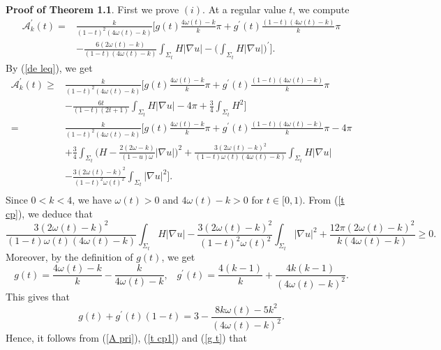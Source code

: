 \documentclass[12pt]{article}
\theoremstyle{definition}
\theoremstyle{plain}
\numberwithin{equation}{section}
\begin{document}
\textbf{Proof of Theorem 1.1}.
First we prove $ (i) $. At a regular value $ t $, we compute
\begin{equation}\label{A pri}
\begin{aligned}
\mathcal{A}_{k}^{\prime}(t)=&\frac{k}{(1-t)^{2}(4\omega(t)-k)}\Big[g(t)\frac{4\omega(t)-k}{k}\pi+g^{\prime}(t)\frac{(1-t)(4\omega(t)-k)}{k}\pi\\
&-\frac{6(2\omega(t)-k)}{(1-t)(4\omega(t)-k)}\int_{\Sigma_{t}}H|\nabla u|-\Big(\int_{\Sigma_{t}}H|\nabla u|\Big)^{\prime} \Big].
\end{aligned}
\end{equation}
By (\ref{de leq}), we get
\begin{equation}
\begin{aligned}
\mathcal{A}_{k}^{\prime}(t)\geq& \frac{k}{(1-t)^{2}(4\omega(t)-k)}\Big[g(t)\frac{4\omega(t)-k}{k}\pi+g^{\prime}(t)\frac{(1-t)(4\omega(t)-k)}{k}\pi\\
&-\frac{6t}{(1-t)(2t+1)}\int_{\Sigma_{t}}H|\nabla u|-4\pi+\frac{3}{4}\int_{\Sigma_{t}}H^{2} \Big]\\
=&\frac{k}{(1-t)^{2}(4\omega(t)-k)}\Big[g(t)\frac{4\omega(t)-k}{k}\pi+g^{\prime}(t)\frac{(1-t)(4\omega(t)-k)}{k}\pi-4\pi\\
&+\frac{3}{4}\int_{\Sigma_{t}}\Big(H-\frac{2(2\omega-k)}{(1-u)\omega}|\nabla u|\Big)^{2}+\frac{3(2\omega(t)-k)^{2}}{(1-t)\omega(t)(4\omega(t)-k)}\int_{\Sigma_{t}}H|\nabla u|\\
&-\frac{3(2\omega(t)-k)^{2}}{(1-t)^{2}\omega(t)^{2}}\int_{\Sigma_{t}}|\nabla u|^{2}\Big].\\
\end{aligned}
\end{equation}
Since $ 0<k<4 $, we have $ \omega(t)>0 $ and $ 4\omega(t)-k>0 $ for $ t\in [0,1) $. From (\ref{t cp}), we deduce that 
\begin{equation}\label{t cp1}
\frac{3(2\omega(t)-k)^{2}}{(1-t)\omega(t)(4\omega(t)-k)}\int_{\Sigma_{t}}H|\nabla u|
-\frac{3(2\omega(t)-k)^{2}}{(1-t)^{2}\omega(t)^{2}}\int_{\Sigma_{t}}|\nabla u|^{2}+\frac{12\pi(2\omega(t)-k)^{2}}{k(4\omega(t)-k)}\geq 0.
\end{equation}
Moreover, by the definition of $ g(t) $, we get 
$$
g(t)=\frac{4\omega(t)-k}{k}-\frac{k}{4\omega(t)-k},\,\,\,\,\,g^{\prime}(t)=\frac{4(k-1)}{k}+\frac{4k(k-1)}{(4\omega(t)-k)^{2}}.
$$
This gives that
\begin{equation}\label{g t}
g(t)+g^{\prime}(t)(1-t)=3-\frac{8k\omega(t)-5k^{2}}{(4\omega(t)-k)^{2}}.
\end{equation}
Hence, it follows from (\ref{A pri}), (\ref{t cp1}) and (\ref{g t}) that 
\end{document}
